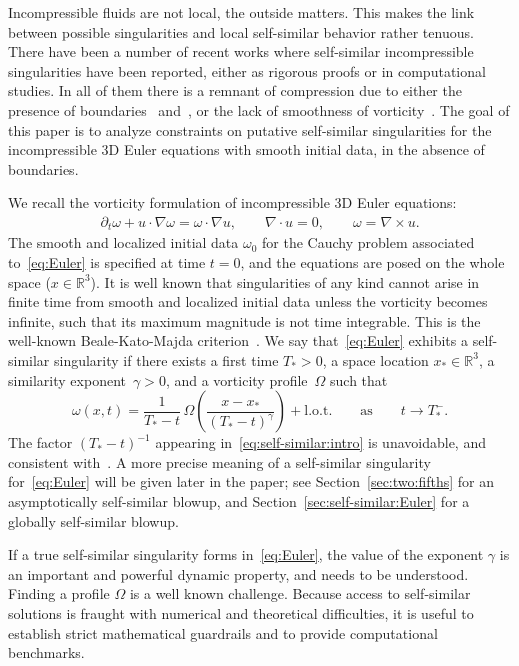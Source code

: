 \documentclass[11pt,reqno]{amsproc}
\numberwithin{equation}{section}
\theoremstyle{remark}
\begin{document}
Incompressible fluids are not local, the outside matters. This makes the link between possible singularities and local self-similar behavior rather tenuous.   There have been a number of recent works where self-similar incompressible singularities have been reported, either as rigorous proofs or in computational studies. In all of them there is a remnant of compression due to either the presence of boundaries~\cite{ChenHou22,ChenHou25a,ChenHou25} and~\cite{GuoLuo14,WLGZB23,WangEtAl25,WLLB25,WLLAH25}, or the lack of smoothness of vorticity~\cite{Elgindi21,ChenHou21,EGM22,ElgindiPasqua23,Chen24,CMZ25}. The goal of this paper is to analyze constraints on putative self-similar singularities for the incompressible 3D Euler equations with smooth initial data, in the absence of boundaries.
 

We recall the vorticity formulation of incompressible 3D Euler equations:
\begin{align}
\partial_t \omega + u \cdot \nabla \omega = \omega \cdot \nabla u, 
\qquad
\nabla \cdot u = 0  , 
\qquad 
\omega = \nabla \times u.
\label{eq:Euler}
\end{align}
The smooth and localized initial data $\omega_0$ for the Cauchy problem associated to~\eqref{eq:Euler} is specified at time $t=0$, and the equations are posed on the whole space ($x \in \mathbb{R}^3$). 
It is well known that singularities of any kind cannot arise in finite time from smooth and localized initial data unless the vorticity becomes infinite, such that its maximum magnitude is not time integrable. This is the well-known Beale-Kato-Majda criterion~\cite{BKM84}. We say that~\eqref{eq:Euler} {exhibits a self-similar singularity} if there exists a first time $T_* >0$, a space location $x_* \in \mathbb{R}^3$, a similarity exponent~$\gamma>0$, and a vorticity profile~$\Omega$ such that 
\begin{equation}
\label{eq:self-similar:intro}
\omega(x,t) = \frac{1}{T_* - t} \, \Omega \left( \frac{x-x_*}{(T_*-t)^\gamma} \right) + \mathrm{l.o.t.}
\qquad 
\mbox{as} 
\qquad t\to T_*^-.
\end{equation}
The factor $(T_*-t)^{-1}$ appearing in~\eqref{eq:self-similar:intro} is unavoidable, and consistent with~\cite{BKM84}.
A more precise meaning of a self-similar singularity for~\eqref{eq:Euler} will be given later in the paper; see Section~\ref{sec:two:fifths} for an asymptotically self-similar blowup, and Section~\ref{sec:self-similar:Euler} for a globally self-similar blowup. 

If a true self-similar singularity forms in~\eqref{eq:Euler}, the value of the exponent $\gamma$ is an important and powerful dynamic property, and needs to be understood. Finding a profile $\Omega$ is a well known challenge. Because access to self-similar solutions is fraught with numerical and theoretical difficulties, it is useful to establish strict mathematical guardrails and to provide computational benchmarks. 
\end{document}

